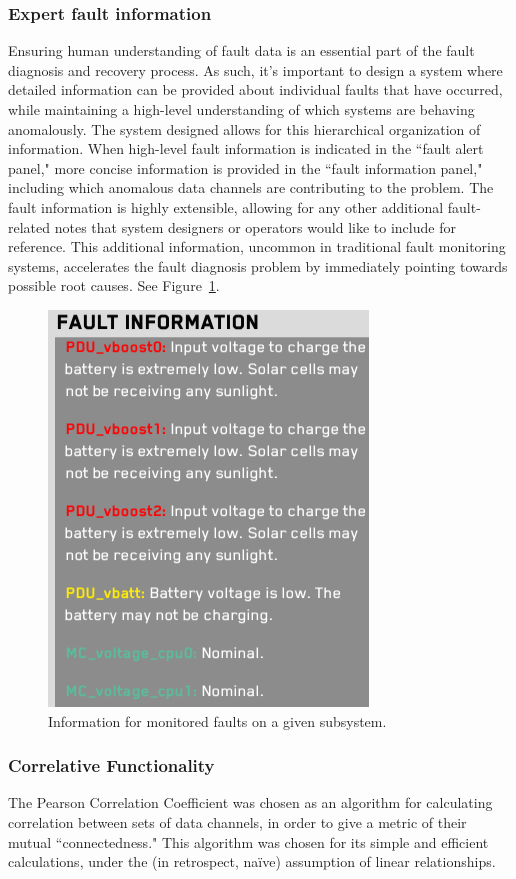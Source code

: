\subsubsection{Expert fault information}

Ensuring human understanding of fault data is an essential part of the fault diagnosis and recovery process. As such, it's important to design a system where detailed information can be provided about individual faults that have occurred, while maintaining a high-level understanding of which systems are behaving anomalously. The system designed allows for this hierarchical organization of information. When high-level fault information is indicated in the ``fault alert panel," more concise information is provided in the ``fault information panel," including which anomalous data channels are contributing to the problem. The fault information is highly extensible, allowing for any other additional fault-related notes that system designers or operators would like to include for reference. This additional information, uncommon in traditional fault monitoring systems, accelerates the fault diagnosis problem by immediately pointing towards possible root causes. See Figure~\ref{fig:fault_info2}.

\begin{figure}[h]
\centering
    \includegraphics[width=0.4\columnwidth]{images/fault_info2.png}
    \caption{Information for monitored faults on a given subsystem.}
    \label{fig:fault_info2}
\end{figure}

\subsubsection{Correlative Functionality}

The Pearson Correlation Coefficient was chosen as an algorithm for calculating correlation between sets of data channels, in order to give a metric of their mutual ``connectedness." This algorithm was chosen for its simple and efficient calculations, under the (in retrospect, na\"{i}ve) assumption of linear relationships.

